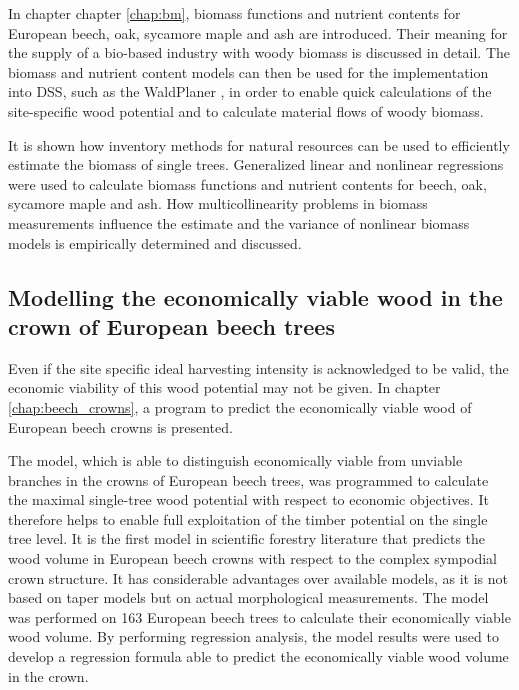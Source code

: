 In chapter chapter \ref{chap:bm}, biomass functions and nutrient contents for European beech, oak, sycamore maple and ash are introduced. Their meaning for the supply of a bio-based industry with woody biomass is discussed in detail. The biomass and nutrient content models can then be used for the implementation into DSS, such as the WaldPlaner \citep{hansen_2014}, in order to enable quick calculations of the site-specific wood potential and to calculate material flows of woody biomass.

It is shown how inventory methods for natural resources can be used to efficiently estimate the biomass of single trees. Generalized linear and nonlinear regressions were used to calculate biomass functions and nutrient contents for beech, oak, sycamore maple and ash. How multicollinearity problems in biomass measurements influence the estimate and the variance of nonlinear biomass models is empirically determined and discussed.

\subsection{Modelling the economically viable wood in the crown of European beech trees}
\label{subsec:intro:struct:beech_crowns}
Even if the site specific ideal harvesting intensity is acknowledged to be valid, the economic viability of this wood potential may not be given. In chapter \ref{chap:beech_crowns}, a program to predict the economically viable wood of European beech crowns is presented.

The model, which is able to distinguish economically viable from unviable branches in the crowns of European beech trees, was programmed to calculate the maximal single-tree wood potential with respect to economic objectives. It therefore helps to enable full exploitation of the timber potential on the single tree level. It is the first model in scientific forestry literature that predicts the wood volume in European beech crowns with respect to the complex sympodial crown structure. It has considerable advantages over available models, as it is not based on taper models but on actual morphological measurements. The model was performed on 163 European beech trees to calculate their economically viable wood volume. By performing regression analysis, the model results were used to develop a regression formula able to predict the economically viable wood volume in the crown.


